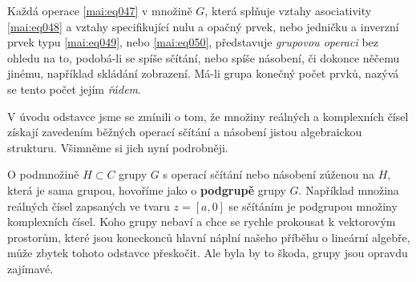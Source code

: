         Každá operace \ref{mai:eq047} v množině \(G\), která splňuje vztahy asociativity 
        \ref{mai:eq048} a vztahy specifikující nulu a opačný prvek, nebo jedničku a inverzní prvek 
        typu \ref{mai:eq049}, nebo \ref{mai:eq050}, představuje \emph{grupovou operaci} bez ohledu 
        na to, podobá-li se spíše sčítání, nebo spíše násobení, či dokonce něčemu jinému, například 
        skládání zobrazení. Má-li grupa konečný počet prvků, nazývá se tento počet jejím 
        \emph{řádem}.

        
        
        V úvodu odstavce jsme se zmínili o tom, že množiny reálných a komplexních čísel získají 
        zavedením běžných operací sčítání a násobení jistou algebraickou strukturu. Všimněme si 
        jich nyní podrobněji. 
        
        
        
        
        
        O podmnožině \(H \subset C\) grupy \(G\) s operací sčítání nebo násobení zúženou na \(H\), 
        která je sama grupou, hovoříme jako o \textbf{podgrupě} grupy \(G\). Například množina 
        reálných čísel zapsaných ve tvaru \(z = [a, 0]\) se sčítáním je podgrupou množiny 
        komplexních čísel. Koho grupy nebaví a chce se rychle prokousat k vektorovým prostorům, 
        které jsou koneckonců hlavní náplní našeho příběhu o lineární algebře, může zbytek tohoto 
        odstavce přeskočit. Ale byla by to škoda, grupy jsou opravdu zajímavé.

        
        
        

